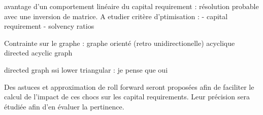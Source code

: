 avantage d'un comportement linéaire du capital requirement : résolution probable avec une inversion de matrice. A etudier
critère d'ptimisation :
- capital requirement
- solvency ratios

Contrainte sur le graphe : graphe orienté (retro unidirectionelle) acyclique directed acyclic graph

directed graph ssi lower triangular : je pense que oui




Des astuces et approximation de roll forward seront proposées afin de faciliter le calcul de l’impact de ces chocs sur les capital requirements. Leur précision sera étudiée afin d’en évaluer la pertinence.


